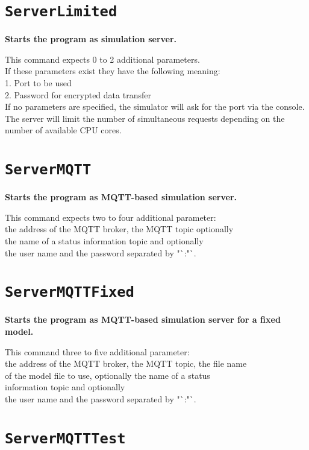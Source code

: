 \section{\texttt{ServerLimited}}

\textbf{Starts the program as simulation server.}

This command expects 0 to 2 additional parameters.\\
If these parameters exist they have the following meaning:\\
1. Port to be used\\
2. Password for encrypted data transfer\\
If no parameters are specified, the simulator will ask for the port via the console.\\
The server will limit the number of simultaneous requests depending on the\\
number of available CPU cores.

\section{\texttt{ServerMQTT}}

\textbf{Starts the program as MQTT-based simulation server.}

This command expects two to four additional parameter:\\
the address of the MQTT broker, the MQTT topic optionally\\
the name of a status information topic and optionally\\
the user name and the password separated by "`:"`.

\section{\texttt{ServerMQTTFixed}}

\textbf{Starts the program as MQTT-based simulation server for a fixed model.}

This command three to five additional parameter:\\
the address of the MQTT broker, the MQTT topic, the file name\\
of the model file to use, optionally the name of a status\\
information topic and optionally\\
the user name and the password separated by "`:"`.

\section{\texttt{ServerMQTTTest}}

